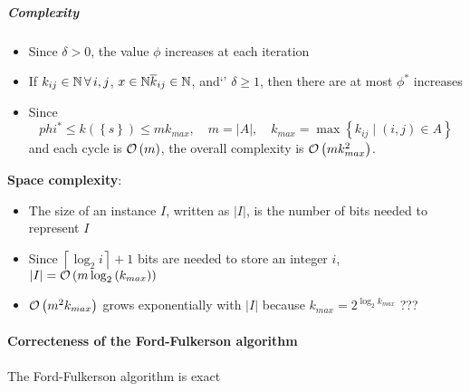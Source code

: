 \documentclass[english]{article}
\begin{document}
\subparagraph*{Complexity}
\begin{itemize}
  \item Since \(\delta > 0\), the value \(\phi\) increases at each iteration
  \item If \(k_{ij} \in \mathbb{N} \, \forall \, i, j\), \(x \in \mathbb{N}\overline{k}_{ij} \in \mathbb{N}\), and`' \(\delta \geq 1\), then there are at most \(\phi^\ast\) increases
  \item Since
        \[ phi^\ast \leq k\left( \left\{ s \right\} \right) \leq m k_{max}, \quad m = |A|, \quad k_{max} = \max\left\{ k_{ij} \mid \left( i, j \right) \in A \right\} \]
        and each cycle is \(\mathcal{O}\left(m\right)\), the overall complexity is \(\mathcal{O}\left(m k_{max}^2\right)\).
\end{itemize}

\textbf{Space complexity}:
\begin{itemize}
  \item The size of an instance \(I\), written as \(|I|\), is the number of bits needed to represent \(I\)
  \item Since \(\left\lceil{\log_2{i}}\right\rceil + 1\) bits are needed to store an integer \(i\), \(|I| = \mathcal{O}\left(m \log_2{\left( k_{max} \right)}\right)\)
  \item \(\mathcal{O}\left(m^2 k_{max}\right)\) grows exponentially with \(|I|\) because \(k_{max} = 2^{\log_2{k_{max}}}\) ??? %
\end{itemize}

\paragraph{Correcteness of the Ford-Fulkerson algorithm}

\begin{proposition}
  The Ford-Fulkerson algorithm is exact
\end{proposition}
\end{document}
